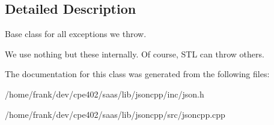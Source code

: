 \subsection{Detailed Description}
Base class for all exceptions we throw.

We use nothing but these internally. Of course, S\+T\+L can throw others. 

The documentation for this class was generated from the following files\+:\begin{DoxyCompactItemize}
\item 
/home/frank/dev/cpe402/saas/lib/jsoncpp/inc/json.\+h\item 
/home/frank/dev/cpe402/saas/lib/jsoncpp/src/jsoncpp.\+cpp\end{DoxyCompactItemize}
